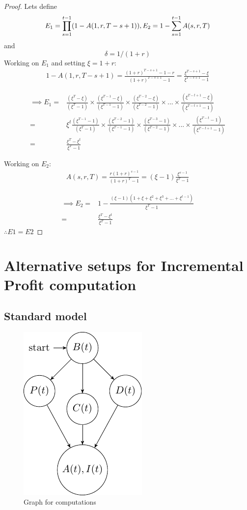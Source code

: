 \begin{proof}{}{} Lets define
\[
E_1=\prod^{t-1}_{s=1}(1-A(1,r,T-s+1)), \\
E_2 =1-\sum^{t-1}_{s=1}A(s,r,T)
\]
and
\[
\delta =1/(1+r)
\]
Working on $E_1$ and setting $\xi=1+r$:
\begin{align}
1-A(1,r,T-s+1) = \frac{(1+r)^{T-s+1}-1-r}{(1+r)^{T-s+1}-1}=\frac{\xi^{T-s+1}-\xi}{\xi^{T-s+1}-1} \nonumber
\end{align}

\begin{align}
\implies E_1 =& \frac{(\xi^T-\xi)}{(\xi^T-1)}\times \frac{(\xi^{T-1}-\xi)}{(\xi^{T-1}-1)} \times \frac{(\xi^{T-2}-\xi)}{(\xi^{T-2}-1)} \times ... \times \frac{(\xi^{T-t+1}-\xi)}{(\xi^{T-t+1}-1)} \nonumber\\
=&\xi^t \frac{(\xi^{T-1}-1)}{(\xi^T-1)}\times \frac{(\xi^{T-2}-1)}{(\xi^{T-1}-1)} \times \frac{(\xi^{T-3}-1)}{(\xi^{T-2}-1)} \times ... \times \frac{(\xi^{T-t}-1)}{(\xi^{T-t+1}-1)} \nonumber\\
=&\frac{\xi^T-\xi^t}{\xi^T-1} \label{eq:e1}
\end{align}

Working on $E_2$:
\begin{align}
A(s,r,T) = \frac{r(1+r)^{s-1}}{(1+r)^{T}-1}=(\xi-1)\frac{\xi^{s-1}}{\xi^{T}-1} \nonumber
\end{align}

\begin{align}
\implies E_2 =& 1-\frac{(\xi-1)(1+\xi+\xi^2+\xi^3+...+\xi^{t-1})}{\xi^T-1}\nonumber\\
=&\frac{\xi^T-\xi^t}{\xi^T-1} 
\end{align}
$\therefore E1=E2$
\end{proof}

\section{Alternative setups for Incremental Profit computation}



\subsection{Standard model \label{can}} 
\begin{figure}[H]
  \centering
      \includegraphics[width=.3\textwidth]{Graph2.pdf} 
 \caption{Graph for computations}
 \label{fig:graph2}
\end{figure}

